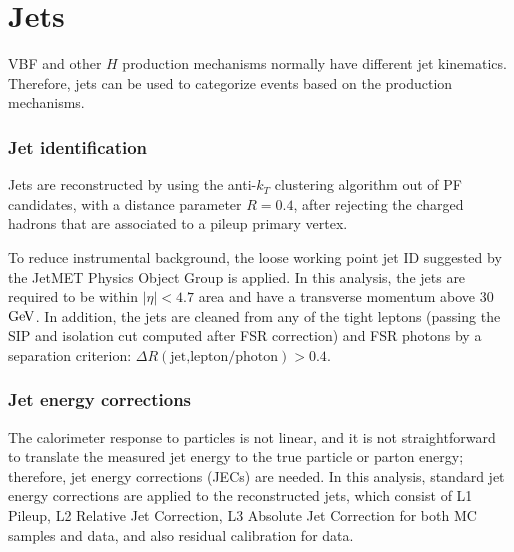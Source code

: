 \section{Jets}
\label{sec:jets}

VBF and other $H$ production mechanisms normally have different jet kinematics. 
Therefore, jets can be used to categorize events based on the production mechanisms.

\subsubsection{Jet identification}

Jets are reconstructed by using the anti-$k_T$ clustering algorithm out of PF candidates, with a distance parameter $R = 0.4$, 
after rejecting the charged hadrons that are associated to a pileup primary vertex.

To reduce instrumental background, the loose working point jet ID suggested by the JetMET Physics Object Group is applied. 
In this analysis, the jets are required to be within $|\eta| < 4.7$ area and have a transverse momentum above 30 $\mathrm{Ge\kern -0.1em V}$. 
In addition, the jets are cleaned from any of the tight leptons (passing the SIP and isolation cut computed after FSR correction) 
and FSR photons by a separation criterion: $\Delta R(\text{jet,lepton/photon}) > 0.4$.


\subsubsection{Jet energy corrections}

The calorimeter response to particles is not linear,
and it is not straightforward to translate the measured jet energy
to the true particle or parton energy; therefore, jet energy corrections (JECs) are needed.
In this analysis, standard jet energy corrections are applied to the reconstructed jets,
which consist of L1 Pileup, L2 Relative Jet Correction,
L3 Absolute Jet Correction for both MC samples and data,
and also residual calibration for data.




